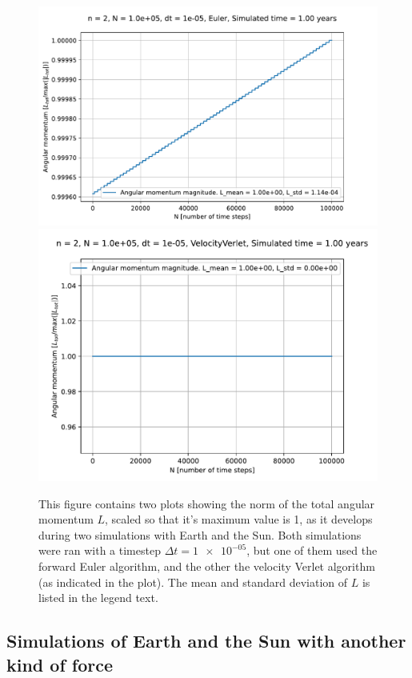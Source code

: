 \documentclass[reprint,english,notitlepage]{revtex4-1}  %
\begin{document}
\begin{figure}[H]
\includegraphics[width=\columnwidth]{../data/figures/sun-earth-3c/se_dt1e-5_fe_angmom.pdf}
\includegraphics[width=\columnwidth]{../data/figures/sun-earth-3c/se_dt1e-5_vv_angmom.pdf}
\caption{This figure contains two plots showing the norm of the total angular momentum $L$, scaled so that it's maximum value is 1, as it develops during two simulations with Earth and the Sun. Both simulations were ran with a timestep $\Delta t = \num{1e-05}$, but one of them used the forward Euler algorithm, and the other the velocity Verlet algorithm (as indicated in the plot). The mean and standard deviation of $L$ is listed in the legend text.   }
\label{fig:se-3c-angmom}
\end{figure}


\subsection{Simulations of Earth and the Sun with another kind of force} \label{sec:IV:c}
\end{document}
